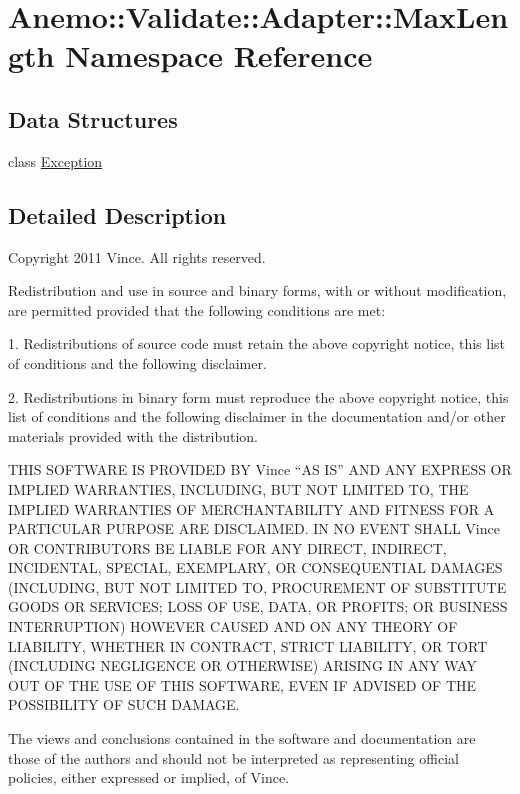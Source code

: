 \hypertarget{namespace_anemo_1_1_validate_1_1_adapter_1_1_max_length}{
\section{Anemo::Validate::Adapter::MaxLength Namespace Reference}
\label{namespace_anemo_1_1_validate_1_1_adapter_1_1_max_length}
}
\subsection*{Data Structures}
\begin{DoxyCompactItemize}
\item 
class \hyperlink{class_anemo_1_1_validate_1_1_adapter_1_1_max_length_1_1_exception}{Exception}
\end{DoxyCompactItemize}


\subsection{Detailed Description}
Copyright 2011 Vince. All rights reserved.

Redistribution and use in source and binary forms, with or without modification, are permitted provided that the following conditions are met:

1. Redistributions of source code must retain the above copyright notice, this list of conditions and the following disclaimer.

2. Redistributions in binary form must reproduce the above copyright notice, this list of conditions and the following disclaimer in the documentation and/or other materials provided with the distribution.

THIS SOFTWARE IS PROVIDED BY Vince ``AS IS'' AND ANY EXPRESS OR IMPLIED WARRANTIES, INCLUDING, BUT NOT LIMITED TO, THE IMPLIED WARRANTIES OF MERCHANTABILITY AND FITNESS FOR A PARTICULAR PURPOSE ARE DISCLAIMED. IN NO EVENT SHALL Vince OR CONTRIBUTORS BE LIABLE FOR ANY DIRECT, INDIRECT, INCIDENTAL, SPECIAL, EXEMPLARY, OR CONSEQUENTIAL DAMAGES (INCLUDING, BUT NOT LIMITED TO, PROCUREMENT OF SUBSTITUTE GOODS OR SERVICES; LOSS OF USE, DATA, OR PROFITS; OR BUSINESS INTERRUPTION) HOWEVER CAUSED AND ON ANY THEORY OF LIABILITY, WHETHER IN CONTRACT, STRICT LIABILITY, OR TORT (INCLUDING NEGLIGENCE OR OTHERWISE) ARISING IN ANY WAY OUT OF THE USE OF THIS SOFTWARE, EVEN IF ADVISED OF THE POSSIBILITY OF SUCH DAMAGE.

The views and conclusions contained in the software and documentation are those of the authors and should not be interpreted as representing official policies, either expressed or implied, of Vince. 